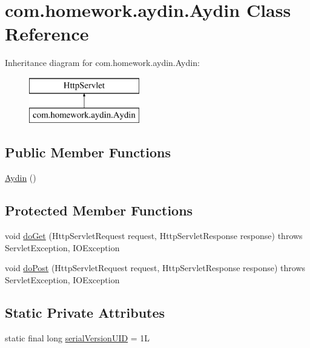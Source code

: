 \hypertarget{classcom_1_1homework_1_1aydin_1_1_aydin}{}\section{com.\+homework.\+aydin.\+Aydin Class Reference}
\label{classcom_1_1homework_1_1aydin_1_1_aydin}
Inheritance diagram for com.\+homework.\+aydin.\+Aydin\+:\begin{figure}[H]
\begin{center}
\leavevmode
\includegraphics[height=2.000000cm]{classcom_1_1homework_1_1aydin_1_1_aydin}
\end{center}
\end{figure}
\subsection*{Public Member Functions}
\begin{DoxyCompactItemize}
\item 
\hyperlink{classcom_1_1homework_1_1aydin_1_1_aydin_a2ede141d77b6e437e10f3da056d7f116}{Aydin} ()
\end{DoxyCompactItemize}
\subsection*{Protected Member Functions}
\begin{DoxyCompactItemize}
\item 
void \hyperlink{classcom_1_1homework_1_1aydin_1_1_aydin_a307f64d407db1b6402d28ffaea0370a9}{do\+Get} (Http\+Servlet\+Request request, Http\+Servlet\+Response response)  throws Servlet\+Exception, I\+O\+Exception 
\item 
void \hyperlink{classcom_1_1homework_1_1aydin_1_1_aydin_af8469a95252334d3e3b350bcae6e7e1f}{do\+Post} (Http\+Servlet\+Request request, Http\+Servlet\+Response response)  throws Servlet\+Exception, I\+O\+Exception 
\end{DoxyCompactItemize}
\subsection*{Static Private Attributes}
\begin{DoxyCompactItemize}
\item 
static final long \hyperlink{classcom_1_1homework_1_1aydin_1_1_aydin_a36327d610cbc4ac41f7c9f3bf5589f23}{serial\+Version\+U\+ID} = 1L
\end{DoxyCompactItemize}


